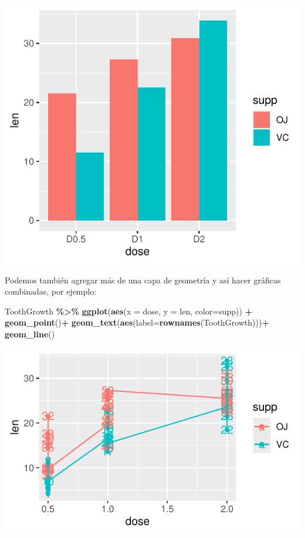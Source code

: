 \documentclass[
]{book}
\newenvironment{Shaded}{\begin{snugshade}}{\end{snugshade}}
\newcommand{\AttributeTok}[1]{\textcolor[rgb]{0.13,0.29,0.53}{#1}}
\newcommand{\FunctionTok}[1]{\textcolor[rgb]{0.13,0.29,0.53}{\textbf{#1}}}
\newcommand{\NormalTok}[1]{#1}
\newcommand{\SpecialCharTok}[1]{\textcolor[rgb]{0.81,0.36,0.00}{\textbf{#1}}}
\begin{document}
\begin{center}\includegraphics{R_Manual_files/figure-latex/unnamed-chunk-209-1} \end{center}

Podemos también agregar más de una capa de geometría y así hacer gráficas combinadas, por ejemplo:\\

\begin{Shaded}
\begin{Highlighting}[]
\NormalTok{ToothGrowth }\SpecialCharTok{\%\textgreater{}\%} \FunctionTok{ggplot}\NormalTok{(}\FunctionTok{aes}\NormalTok{(}\AttributeTok{x =}\NormalTok{ dose, }\AttributeTok{y =}\NormalTok{ len, }\AttributeTok{color=}\NormalTok{supp)) }\SpecialCharTok{+}
  \FunctionTok{geom\_point}\NormalTok{()}\SpecialCharTok{+}
  \FunctionTok{geom\_text}\NormalTok{(}\FunctionTok{aes}\NormalTok{(}\AttributeTok{label=}\FunctionTok{rownames}\NormalTok{(ToothGrowth)))}\SpecialCharTok{+}
  \FunctionTok{geom\_line}\NormalTok{()}
\end{Highlighting}
\end{Shaded}

\begin{center}\includegraphics{R_Manual_files/figure-latex/unnamed-chunk-210-1} \end{center}
\end{document}
